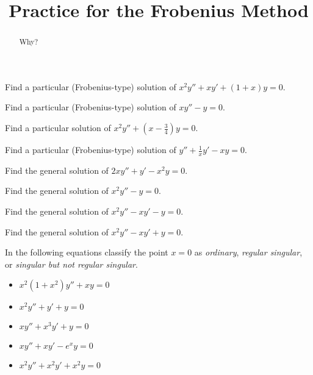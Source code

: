 \documentclass{ximera}
\title{Practice for the Frobenius Method}
\begin{document}
\begin{abstract}
Why?
\end{abstract}
\maketitle


\begin{exercise}
    Find a particular (Frobenius-type) solution of $x^2 y'' + x y' + (1+x) y = 0$.
\end{exercise}

\begin{exercise}
    Find a particular (Frobenius-type) solution of $x y'' - y = 0$.
\end{exercise}

\begin{exercise}%
    Find a particular solution of $x^2 y'' +(x-\frac{3}{4})y = 0$.
\end{exercise}

\begin{exercise}
    Find a particular (Frobenius-type) solution of $y'' +\frac{1}{x}y' - xy = 0$.
\end{exercise}

\begin{exercise}
    Find the general solution of $2 x y'' + y' - x^2 y = 0$.
\end{exercise}

\begin{exercise}%
    Find the general solution of $x^2 y'' -y = 0$.
\end{exercise}

\begin{exercise}
    Find the general solution of $x^2 y'' - x y' -y = 0$.
\end{exercise}

\begin{exercise}%
    Find the general solution of $x^2 y'' - x y' +y = 0$.
\end{exercise}

\begin{exercise}
    In the following equations classify the point $x=0$ as \emph{ordinary}, \emph{regular singular}, or \emph{singular but not regular singular}.
    \begin{itemize}
        \item $x^2(1+x^2)y''+xy=0$
        \item $x^2y''+y'+y=0$
        \item $xy''+x^3y'+y=0$
        \item $xy''+xy'-e^xy=0$
        \item $x^2y''+x^2y'+x^2y=0$
    \end{itemize}
\end{exercise}
\end{document}
